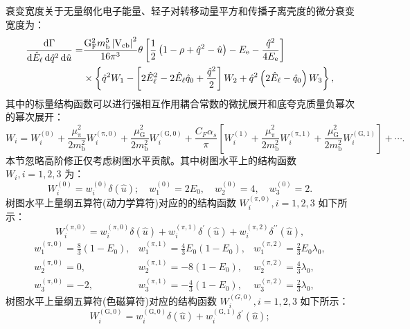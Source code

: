     衰变宽度关于无量纲化电子能量、轻子对转移动量平方和传播子离壳度的微分衰变宽度为：
    \begin{equation}
        \begin{aligned}
        \frac{\mathrm{d} \Gamma}{\mathrm{d} \hat{E}_{\mathrm{\ell}} \, \mathrm{d} \hat{q}^2 \, \mathrm{d} \hat{u}} = & \frac{\mathrm{G_F^2} m_{\mathrm{b}}^5 \left| \mathrm{V_{\mathrm{cb}}} \right|^2}{16 \pi^3} \theta \left[ \frac{1}{2} \left( 1 - \rho + \hat{q}^2 - \hat{u} \right) - E_{\mathrm{e}} - \frac{\hat{q}^2}{4 E_{\mathrm{e}}} \right] \\
        & \times \left\{ \hat{q}^2 W_1 - \left[ 2 \hat{E}_{\mathrm{\ell}}^2 - 2 \hat{E}_{\mathrm{\ell}} \hat{q}_0 + \frac{\hat{q}^2}{2} \right] W_2 + \hat{q}^2 \left( 2 \hat{E}_{\mathrm{\ell}} - \hat{q}_0 \right) W_3 \right\},
        \end{aligned}
        \label{eq:diffwidth_2}
        \end{equation}   
        其中的标量结构函数可以进行强相互作用耦合常数的微扰展开和底夸克质量负幂次的幂次展开：     
$$
W_i = W_i^{(0)} + \frac{\mu_{\mathrm{\pi}}^2}{2 m_{\mathrm{b}}^2} W_i^{(\mathrm{\pi}, 0)} + \frac{\mu_{\mathrm{G}}^2}{2 m_{\mathrm{b}}^2} W_i^{(\mathrm{G}, 0)} + \frac{C_F \alpha_s}{\pi} \left[ W_i^{(1)} + \frac{\mu_{\mathrm{\pi}}^2}{2 m_{\mathrm{b}}^2} W_i^{(\mathrm{\pi}, 1)} + \frac{\mu_{\mathrm{G}}^2}{2 m_{\mathrm{b}}^2} W_i^{(\mathrm{G}, 1)} \right]+\cdots.
$$
本节忽略高阶修正仅考虑树图水平贡献。其中树图水平上的结构函数 $W_{i}, i=1,2,3$ 为：
$$
W_i^{(0)}=w_i^{(0)} \delta(\hat{u}) ; \quad w_1^{(0)}=2 E_0, \quad w_2^{(0)}=4, \quad w_3^{(0)}=2.
$$
树图水平上量纲五算符(动力学算符)对应的的结构函数 $W_{i}^{(\pi,0)}, i=1,2,3$ 如下所示：
\begin{equation}
W_i^{(\pi, 0)}=w_i^{(\pi, 0)} \delta(\hat{u})+w_i^{(\pi, 1)} \delta^{\prime}(\hat{u})+w_i^{(\pi, 2)} \delta^{\prime \prime}(\hat{u}),
\end{equation}
$$
\begin{array}{lll}
w_1^{(\pi, 0)}=\frac{8}{3}\left(1-E_0\right), & w_1^{(\pi, 1)}=\frac{4}{3} E_0\left(1-E_0\right), & w_1^{(\pi, 2)}=\frac{2}{3} E_0 \lambda_0 ,\\
w_2^{(\pi, 0)}=0, & w_2^{(\pi, 1)}=-8\left(1-E_0\right), & w_2^{(\pi, 2)}=\frac{4}{3} \lambda_0 , \\
w_3^{(\pi, 0)}=-2, & w_3^{(\pi, 1)}=-\frac{4}{3}\left(1-E_0\right), & w_3^{(\pi, 2)}=\frac{2}{3} \lambda_0,
\end{array}
$$
树图水平上量纲五算符(色磁算符)对应的结构函数 $W_{i}^{(G,0)}, i=1,2,3$ 如下所示：
\begin{equation}
    W_i^{(\mathrm{G}, 0)} = w_i^{(\mathrm{G}, 0)} \delta(\hat{u}) + w_i^{(\mathrm{G}, 1)} \delta^{\prime}(\hat{u});
    \end{equation}
